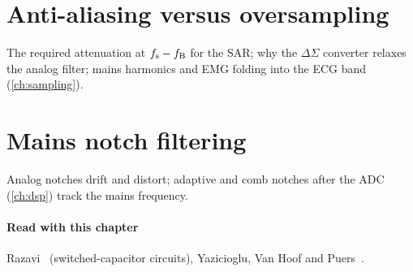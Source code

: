 \section{Anti-aliasing versus oversampling}\label{sec:ch11-3}
The required attenuation at $f_\mathrm{s} - f_\mathrm{B}$ for the SAR; why the $\Delta\Sigma$ converter relaxes the analog filter; mains harmonics and EMG folding into the ECG band (\cref{ch:sampling}).

\section{Mains notch filtering}\label{sec:ch11-4}
Analog notches drift and distort; adaptive and comb notches after the ADC (\cref{ch:dsp}) track the mains frequency.

\paragraph{Read with this chapter} Razavi~\cite{razavi} (switched-capacitor circuits), Yazicioglu, Van Hoof and Puers~\cite{yazicioglubook}.
